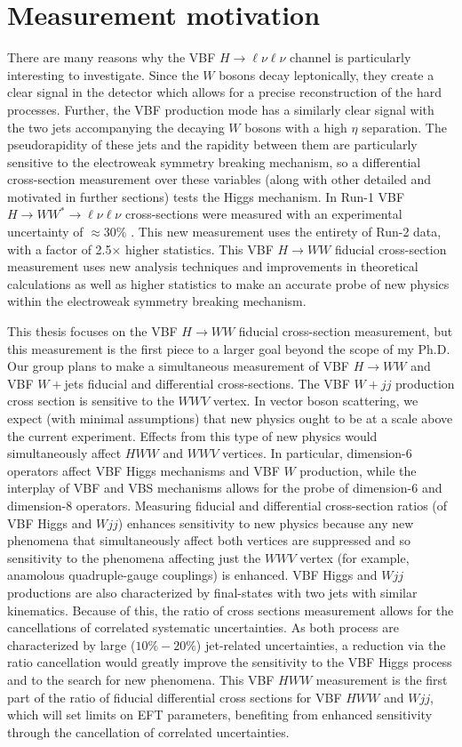 \section{Measurement motivation}
There are many reasons why the VBF $H\rightarrow\ell\nu\ell\nu$ channel is particularly interesting to investigate. Since the $W$ bosons decay leptonically, they create a clear signal in the detector which allows for a precise reconstruction of the hard processes. Further, the VBF production mode has a similarly clear signal with the two jets accompanying the decaying $W$ bosons with a high $\eta$ separation. The pseudorapidity of these jets and the rapidity between them are particularly sensitive to the electroweak symmetry breaking mechanism, so a differential cross-section measurement over these variables (along with other detailed and motivated in further sections) tests the Higgs mechanism. In Run-1 VBF $H\rightarrow WW^* \rightarrow \ell\nu\ell\nu$ cross-sections were measured with an experimental uncertainty of $\approx30\%$ \cite{HiggsCurrent}. This new measurement uses the entirety of Run-2 data, with a factor of 2.5$\times$ higher statistics. This VBF $H\rightarrow WW$ fiducial cross-section measurement uses new analysis techniques and improvements in theoretical calculations as well as higher statistics to make an accurate probe of new physics within the electroweak symmetry breaking mechanism.

This thesis focuses on the VBF $H\rightarrow WW$ fiducial cross-section measurement, but this measurement is the first piece to a larger goal beyond the scope of my Ph.D. Our group plans to make a simultaneous measurement of VBF $H\rightarrow WW$ and VBF $W+$jets fiducial and differential cross-sections. The VBF $W+jj$ production cross section is sensitive to the $WWV$ vertex. In vector boson scattering, we expect (with minimal assumptions) that new physics ought to be at a scale above the current experiment. Effects from this type of new physics would simultaneously affect $HWW$ and $WWV$ vertices. In particular, dimension-6 operators affect VBF Higgs mechanisms and VBF $W$ production, while the interplay of VBF and VBS mechanisms allows for the probe of dimension-6 and dimension-8 operators. Measuring fiducial and differential cross-section ratios (of VBF Higgs and $Wjj$) enhances sensitivity to new physics because any new phenomena that simultaneously affect both vertices are suppressed and so sensitivity to the phenomena affecting just the $WWV$ vertex (for example, anamolous quadruple-gauge couplings) is enhanced.  VBF Higgs and $Wjj$ productions are also characterized by final-states with two jets with similar kinematics. Because of this, the ratio of cross sections measurement allows for the cancellations of correlated systematic uncertainties. As both process are characterized by large ($10\%-20\%$) jet-related uncertainties, a reduction via the ratio cancellation would greatly improve the sensitivity to the VBF Higgs process and to the search for new phenomena. This VBF $HWW$ measurement is the first part of the ratio of fiducial differential cross sections for VBF $HWW$ and $Wjj$, which will set limits on EFT parameters, benefiting from enhanced sensitivity through the cancellation of correlated uncertainties. 

